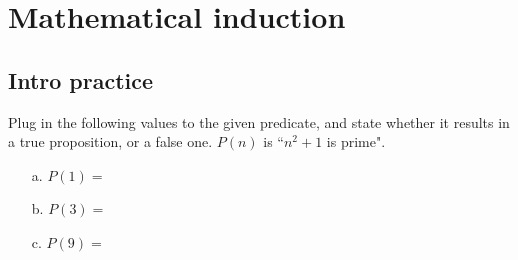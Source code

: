
\newcommand{\laClass}       {CS 210}
\newcommand{\laSemester}    {Spring 2018}
\newcommand{\laChapter}     {2.3}
\newcommand{\laType}        {Exercise}
\newcommand{\laPoints}      {5}
\newcommand{\laTitle}       {Mathematical Induction}
\newcommand{\laDate}        {}
\setcounter{chapter}{2}
\setcounter{section}{3}
\addtocounter{section}{-1}

\toggletrue{answerkey}





    \section{Mathematical induction}

    \subsection{Intro practice}

        \begin{questionNOGRADE}{\thequestion}

            Plug in the following values to the given predicate, and state
            whether it results in a true proposition, or a false one.
            $P(n)$ is ``$n^{2} + 1$ is prime".

            \begin{itemize}
                \item[a.] $P(1) = $ 
                \item[b.] $P(3) = $ 
                \item[c.] $P(9) = $ 
            \end{itemize}
            
        \end{questionNOGRADE}

        \hrulefill

